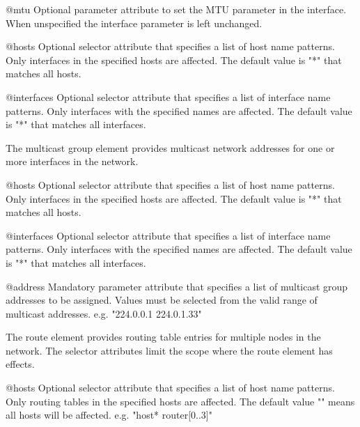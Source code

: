 \begin{description}
\begin{compactdesc}
   \item[@mtu]
     Optional parameter attribute to set the MTU parameter in the interface.
     When unspecified the interface parameter is left unchanged.
   \end{compactdesc}
 \item[<wireless>]
   \begin{compactdesc}
   \item[@hosts]
     Optional selector attribute that specifies a list of host name patterns.
     Only interfaces in the specified hosts are affected. The default value
     is "*" that matches all hosts.

   \item[@interfaces]
     Optional selector attribute that specifies a list of interface name
     patterns. Only interfaces with the specified names are affected. The
     default value is "*" that matches all interfaces.
   \end{compactdesc}
 \item[<multicast-group>]
   The multicast group element provides multicast network addresses for one
   or more interfaces in the network.
   \begin{compactdesc}
   \item[@hosts]
     Optional selector attribute that specifies a list of host name patterns.
     Only interfaces in the specified hosts are affected. The default value
     is "*" that matches all hosts.

   \item[@interfaces]
     Optional selector attribute that specifies a list of interface name
     patterns. Only interfaces with the specified names are affected. The
     default value is "*" that matches all interfaces.

   \item[@address]
     Mandatory parameter attribute that specifies a list of multicast group
     addresses to be assigned. Values must be selected from the valid range
     of multicast addresses.
     e.g. "224.0.0.1 224.0.1.33"
   \end{compactdesc}
 \item[<route>]
   The route element provides routing table entries for multiple nodes
   in the network. The selector attributes limit the scope where the route
   element has effects.
   \begin{compactdesc}
   \item[@hosts]
     Optional selector attribute that specifies a list of host name patterns.
     Only routing tables in the specified hosts are affected. The default
     value "" means all hosts will be affected.
     e.g. "host* router[0..3]"


\end{compactdesc}
\end{description}
